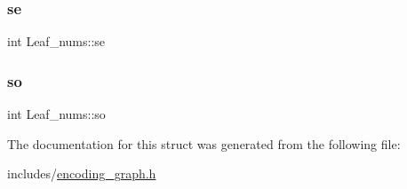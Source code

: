 \subsubsection{\texorpdfstring{se}{se}}
{\footnotesize\ttfamily int Leaf\+\_\+nums\+::se}

\mbox{\label{structLeaf__nums_a32b3e25b99383c612970591174f75885}} 
\subsubsection{\texorpdfstring{so}{so}}
{\footnotesize\ttfamily int Leaf\+\_\+nums\+::so}



The documentation for this struct was generated from the following file\+:\begin{DoxyCompactItemize}
\item 
includes/\hyperlink{encoding__graph_8h}{encoding\+\_\+graph.\+h}\end{DoxyCompactItemize}
